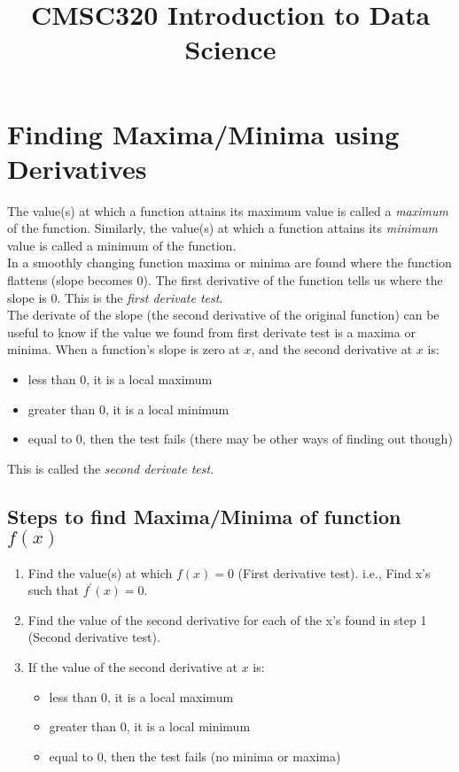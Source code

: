 \documentclass[12pt]{article}
\title{CMSC320 Introduction to Data Science}
\begin{document}
\maketitle


\section*{Finding Maxima/Minima using Derivatives}

The value(s) at which a function attains its maximum value is called a \textit{maximum} of the function. Similarly, the value(s) at which a function attains its \textit{minimum} value is called a minimum of the function.\\

In a smoothly changing function maxima or minima are found where the function flattens (slope becomes $0$). The first derivative of the function tells us where the slope is $0$. This is the \textit{first derivate test}.\\

The derivate of the slope (the second derivative of the original function) can be useful to know if the value we found from first derivate test is a maxima or minima. When a function's slope is zero at $x$, and the second derivative at $x$ is:
\begin{itemize}
	\item less than 0, it is a local maximum
	\item greater than 0, it is a local minimum
	\item equal to 0, then the test fails (there may be other ways of finding out though)
\end{itemize}
This is called the \textit{second derivate test}.

\subsection*{Steps to find Maxima/Minima of function $f(x)$}
\begin{enumerate}
	\item Find the value(s) at which $f(x)=0$ (First derivative test). i.e.,  Find x's such that $f^{'}(x)=0$. 
	\item Find the value of the second derivative for each of the x's found in step 1 (Second derivative test).
	\item If the value of the second derivative at $x$ is:
	\begin{itemize}
		\item less than 0, it is a local maximum
		\item greater than 0, it is a local minimum
		\item equal to 0, then the test fails (no minima or maxima)
	\end{itemize}
\end{enumerate}
\end{document}
